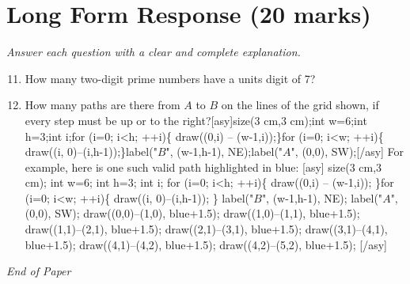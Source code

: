 \documentclass[12pt]{article}
\begin{document}
\section*{Long Form Response (20 marks)}
\textit{Answer each question with a clear and complete explanation.}
\begin{enumerate}[label=\arabic*.]
\setcounter{enumi}{10}
\item How many two-digit prime numbers have a units digit of 7?
\item How many paths are there from $A$ to $B$ on the lines of the grid shown, if every step must be up or to the right?[asy]size(3 cm,3 cm);int w=6;int h=3;int i;for (i=0; i\textless{}h; ++i)\{ draw((0,i) -- (w-1,i));\}for (i=0; i\textless{}w; ++i)\{ draw((i, 0)--(i,h-1));\}label("$B$", (w-1,h-1), NE);label("$A$", (0,0), SW);[/asy] For example, here is one such valid path highlighted in blue: [asy] size(3 cm,3 cm); int w=6; int h=3; int i; for (i=0; i\textless{}h; ++i)\{ draw((0,i) -- (w-1,i)); \}for (i=0; i\textless{}w; ++i)\{ draw((i, 0)--(i,h-1)); \} label("$B$", (w-1,h-1), NE); label("$A$", (0,0), SW); draw((0,0)--(1,0), blue+1.5); draw((1,0)--(1,1), blue+1.5); draw((1,1)--(2,1), blue+1.5); draw((2,1)--(3,1), blue+1.5); draw((3,1)--(4,1), blue+1.5); draw((4,1)--(4,2), blue+1.5); draw((4,2)--(5,2), blue+1.5); [/asy]
\end{enumerate}

\vfill
\noindent\textit{End of Paper}
\end{document}

